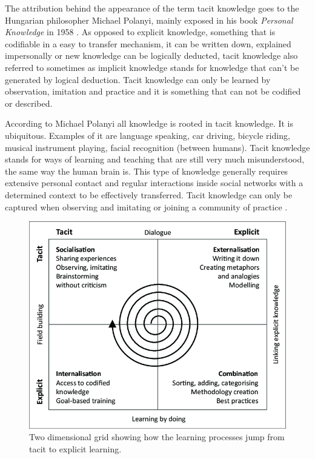 The attribution behind the appearance of the term tacit knowledge goes to the 
Hungarian philosopher Michael Polanyi, mainly exposed in his book 
\textit{Personal Knowledge} in 1958 \cite{tacitknowledgerevisited}.
As opposed to explicit knowledge, something that is codifiable in a easy to transfer
mechanism, it can be written down, explained impersonally or new knowledge can be 
logically deducted, tacit knowledge also referred to
sometimes as implicit knowledge stands for knowledge that can't be generated by 
logical deduction. Tacit knowledge can only be learned by observation, imitation and
practice and it is something that can not be codified or described. \cite{polanyi_1958}

According to Michael Polanyi all knowledge is rooted in tacit knowledge. It is 
ubiquitous. Examples of it are language speaking, car driving, bicycle riding, 
musical instrument playing, facial recognition (between humans). Tacit knowledge 
stands for ways of learning and teaching that are still very much misunderstood, the
same way the human brain is. This type of knowledge generally requires extensive 
personal contact and regular interactions inside social networks with a determined
context to be effectively transferred. Tacit knowledge can only be captured when 
observing and imitating or joining a community of practice \cite{goffin_koners_2011}.

\begin{figure}
    \centering
    \includegraphics[width=16cm]{images/tacit.png}
    \caption{
        Two dimensional grid showing how the learning processes jump from tacit to 
        explicit learning.
    }
    \label{fig:tacit}
\end{figure}


